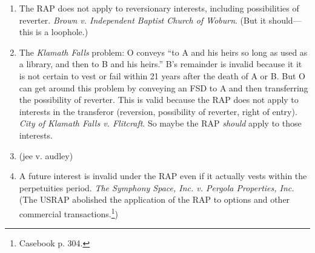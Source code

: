 \begin{enumerate}
\begin{enumerate}
\begin{enumerate}
\begin{enumerate}
                \item Valid: O transfers land ``in trust for A to life, then 
                to A's first child to reach 21.'' A is the validating life. 
                The interest in A's first child to reach 21 will necessarily 
                vest prior to A's life plus 21 years. Since you can prove that 
                the interest must vest within this period, the remainder is 
                valid.\footnote{Casebook pp. 286--87.}
                \item Invalid: O transfers land ``in trust to A for life, then 
                to A's first child to reach 25.'' The interest will not 
                necessarily vest before after A's life plus 21 years. Thus, 
                the remainder is invalid.
                \item Invalid: to A and his heirs so long as used for school 
                purposes, and then to B and his heirs. The interest will not 
                necessarily vest or terminate within A or B's lifetimes.
            \end{enumerate}
            \item The RAP does not apply to reversionary interests, including 
            possibilities of reverter. \emph{Brown v. Independent Baptist 
            Church of Woburn}. (But it should---this is a loophole.)
            \item The \emph{Klamath Falls} problem: O conveys ``to A and his 
            heirs so long as used as a library, and then to B and his heirs.'' 
            B's remainder is invalid because it it is not certain to vest or 
            fail within 21 years after the death of A or B. But O can get 
            around this problem by conveying an FSD to A and then transferring 
            the possibility of reverter. This is valid because the RAP does 
            not apply to interests in the transferor (reversion, possibility 
            of reverter, right of entry). \emph{City of Klamath 
            Falls v. Flitcraft}. So maybe the RAP \emph{should} apply to those 
            interests.
            \item (jee v. audley) %
            \item A future interest is invalid under the RAP even if it 
            actually vests within the perpetuities period. \emph{The Symphony 
            Space, Inc. v. Pergola Properties, Inc.} (The USRAP abolished the 
            application of the RAP to options and other commercial 
            transactions.\footnote{Casebook p. 304.})

\end{enumerate}
\end{enumerate}
\end{enumerate}
